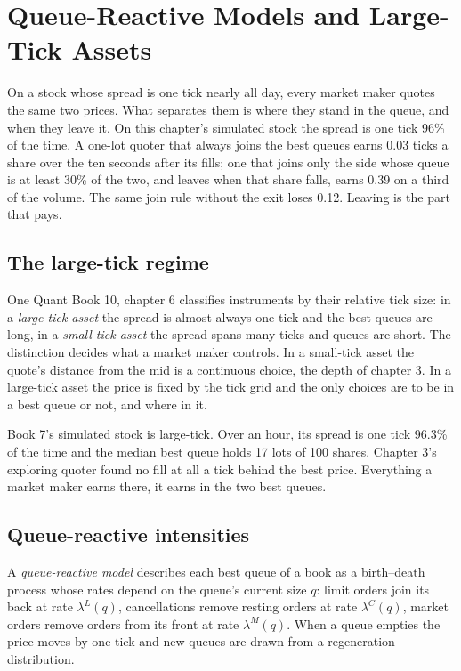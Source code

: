 \chapter{Queue-Reactive Models and Large-Tick Assets}\label{ch:hf:queue-reactive-models-and-large-tick-assets}

On a stock whose spread is one tick nearly all day, every market maker quotes the same two prices. What separates them is where they stand in the
queue, and when they leave it. On this chapter's simulated stock the spread is one tick 96\% of the time. A one-lot quoter that always joins the
best queues earns 0.03 ticks a share over the ten seconds after its fills; one that joins only the side whose queue is at least 30\% of the two,
and leaves when that share falls, earns 0.39 on a third of the volume. The same join rule without the exit loses 0.12. Leaving is the part that
pays.

\section{The large-tick regime}

One Quant Book 10, chapter 6 classifies instruments by their relative tick size: in a \emph{large-tick asset} the spread is almost always one tick
and the best queues are long, in a \emph{small-tick asset} the spread spans many ticks and queues are short. The distinction decides what a market
maker controls. In a small-tick asset the quote's distance from the mid is a continuous choice, the depth of chapter 3. In a large-tick asset the
price is fixed by the tick grid and the only choices are to be in a best queue or not, and where in it.

Book 7's simulated stock is large-tick. Over an hour, its spread is one tick 96.3\% of the time and the median best queue holds 17 lots of 100
shares. Chapter 3's exploring quoter found no fill at all a tick behind the best price. Everything a market maker earns there, it earns in the two
best queues.

\section{Queue-reactive intensities}

\begin{definition}\label{def:hf:queue-reactive-models-and-large-tick-assets:qr}
A \emph{queue-reactive model} describes each best queue of a book as a birth--death process whose rates depend on the
queue's current size $q$: limit orders join its back at rate $\lambda^L(q)$, cancellations remove resting orders at rate $\lambda^C(q)$, market
orders remove orders from its front at rate $\lambda^M(q)$. When a queue empties the price moves by one tick and new queues are drawn from a
regeneration distribution.
\end{definition}

